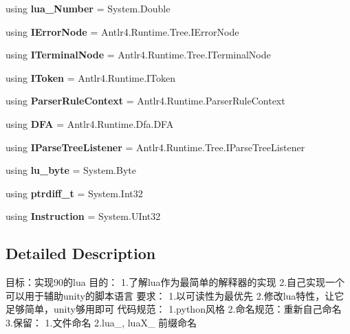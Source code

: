 \begin{DoxyCompactItemize}
\item 
\mbox{\label{namespacezlua_a366bdbff38407c9efbf04054127ed3cc}} 
using {\bfseries lua\+\_\+\+Number} = System.\+Double
\item 
\mbox{\label{namespacezlua_aaa93e7c8244f49c8ea4a06de6632b905}} 
using {\bfseries I\+Error\+Node} = Antlr4.\+Runtime.\+Tree.\+I\+Error\+Node
\item 
\mbox{\label{namespacezlua_a2a234ddba24aacdde8d3d6027feca6f9}} 
using {\bfseries I\+Terminal\+Node} = Antlr4.\+Runtime.\+Tree.\+I\+Terminal\+Node
\item 
\mbox{\label{namespacezlua_a21f4f40ba2a397ae3f94bee5cb5c5538}} 
using {\bfseries I\+Token} = Antlr4.\+Runtime.\+I\+Token
\item 
\mbox{\label{namespacezlua_afdb9d11994c29edae3688ab893c6daba}} 
using {\bfseries Parser\+Rule\+Context} = Antlr4.\+Runtime.\+Parser\+Rule\+Context
\item 
\mbox{\label{namespacezlua_a2786e51a9dbfe724b881a447b7a8aeb8}} 
using {\bfseries D\+FA} = Antlr4.\+Runtime.\+Dfa.\+D\+FA
\item 
\mbox{\label{namespacezlua_a3556e4be3adbc82eeee921e503860d87}} 
using {\bfseries I\+Parse\+Tree\+Listener} = Antlr4.\+Runtime.\+Tree.\+I\+Parse\+Tree\+Listener
\item 
\mbox{\label{namespacezlua_a594fa70411ab513608e3570dd6a525bd}} 
using {\bfseries lu\+\_\+byte} = System.\+Byte
\item 
\mbox{\label{namespacezlua_a3299a6560fca65b6b35ad9a9dc102b82}} 
using {\bfseries ptrdiff\+\_\+t} = System.\+Int32
\item 
\mbox{\label{namespacezlua_a7137c618516f8b04a8a1a0cd15d977a4}} 
using {\bfseries Instruction} = System.\+U\+Int32
\end{DoxyCompactItemize}


\subsection{Detailed Description}
目标：实现90的lua 目的： 1.了解lua作为最简单的解释器的实现 2.自己实现一个可以用于辅助unity的脚本语言 要求： 1.以可读性为最优先 2.修改lua特性，让它足够简单，unity够用即可 代码规范： 1.\+python风格 2.命名规范：重新自己命名 3.保留： 1.文件命名 2.\+lua\+\_\+, lua\+X\+\_\+ 前缀命名 

